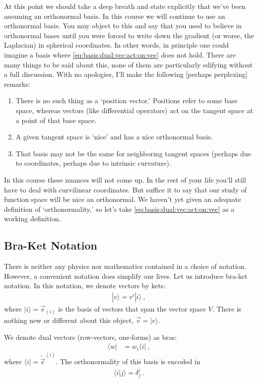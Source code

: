 At this point we should take a deep breath and state explicitly that we’ve been assuming an orthonormal basis. In this course we will continue to use an orthonormal basis. You may object to this and say that you used to believe in orthonormal bases until you were forced to write down the gradient (or worse, the Laplacian) in spherical coordinates. 
%
In other words, in principle one could imagine a basis where \eqref{eq:basis:dual:vec:act:on:vec} does not hold.
%
There are many things to be said about this, none of them are particularly edifying without a full discussion. With no apologies, I’ll make the following [perhaps perplexing] remarks:
\begin{enumerate}
\item There is no such thing as a `position vector.' Positions refer to some base space, whereas vectors (like differential operators) act on the tangent space at a point of that base space. 
\item A given tangent space is `nice’ and has a nice orthonormal basis. 
\item That basis may not be the same for neighboring tangent spaces (perhaps due to coordinates, perhaps due to intrinsic curvature). 
\end{enumerate}
In this course these nuances will not come up. In the rest of your life you’ll still have to deal with curvilinear coordinates. But suffice it to say that our study of function space will be nice an orthonormal. We haven’t yet given an adequate definition of `orthonormality,’ so let's take \eqref{eq:basis:dual:vec:act:on:vec} as a working definition.




\subsection{Bra-Ket Notation}

There is neither any physics nor mathematics contained in a choice of notation. However, a convenient notation does simplify our lives. Let us introduce bra-ket notation. In this notation, we denote vectors by kets:
\begin{align}
  |v\rangle = v^i|i\rangle \ ,
\end{align}
where $|i\rangle = \vec{e}_{(i)}$ is the basis of vectors that span the vector space $V$. There is nothing new or different about this object,  $\vec{v} = |v \rangle$.

We denote dual vectors (row-vectors, one-forms) as bras:
\begin{align}
  \langle w | &= w_i \langle i| \ ,
\end{align}
where $\langle i | = \tilde{\vec{e}}^{(i)}$. The orthonormality of this basis is encoded in 
\begin{align}
  \langle i | j \rangle = \delta^i_j \ .
\end{align}

